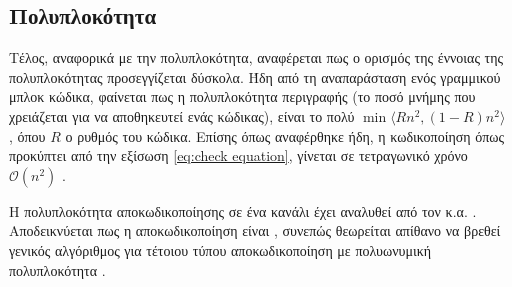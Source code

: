 \subsection{Πολυπλοκότητα}

Τέλος, αναφορικά με την πολυπλοκότητα, αναφέρεται πως ο ορισμός της έννοιας της πολυπλοκότητας προσεγγίζεται δύσκολα. Ήδη από τη αναπαράσταση ενός γραμμικού μπλοκ κώδικα, φαίνεται πως η πολυπλοκότητα περιγραφής (το ποσό μνήμης που χρειάζεται για να αποθηκευτεί ενάς κώδικας), είναι το πολύ $\min\langle Rn^2, \left(1-R\right)n^2\rangle$ , όπου $R$ ο ρυθμός του κώδικα. Επίσης όπως αναφέρθηκε ήδη, η κωδικοποίηση όπως προκύπτει από την εξίσωση \ref{eq:check equation}, γίνεται σε τετραγωνικό χρόνο $\mathcal{O}(n^2)$ \cite{richardson2008modern}.

Η πολυπλοκότητα αποκωδικοποίησης  σε ένα κανάλι  έχει αναλυθεί από τον  κ.α. \cite{berlekamp1978inherent}. Αποδεικνύεται πως η  αποκωδικοποίηση είναι , συνεπώς θεωρείται απίθανο να βρεθεί γενικός αλγόριθμος για τέτοιου τύπου αποκωδικοποίηση με πολυωνυμική πολυπλοκότητα \cite{bruck1990hardness}.
